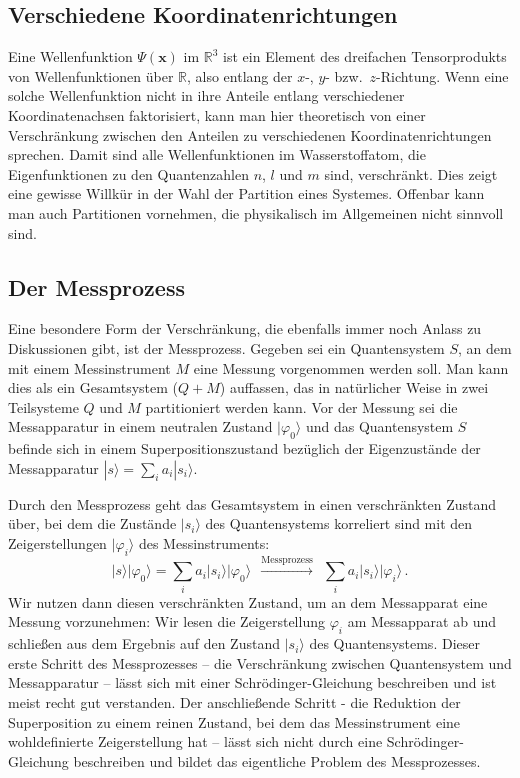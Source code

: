 \subsection{Verschiedene Koordinatenrichtungen}

Eine Wellenfunktion $\Psi(\pmb{x})$ im $\mathbb{R}^3$ ist ein Element des dreifachen Tensorprodukts
von Wellenfunktionen \"uber $\mathbb{R}$, also entlang der $x$-, $y$- bzw.\ $z$-Richtung. 
Wenn eine solche Wellenfunktion nicht in ihre Anteile entlang verschiedener Koordinatenachsen
faktorisiert, kann man hier theoretisch von einer Verschr\"ankung zwischen den Anteilen zu verschiedenen 
Koordinatenrichtungen sprechen. 
Damit sind alle Wellenfunktionen im Wasserstoffatom, die Eigenfunktionen zu
den Quantenzahlen $n$, $l$ und $m$ sind, verschr\"ankt. Dies zeigt eine gewisse Willk\"ur
in der Wahl der Partition eines Systemes. Offenbar kann man auch Partitionen vornehmen,
die physikalisch im Allgemeinen nicht sinnvoll sind. 

\subsection{Der Messprozess}

Eine besondere Form der Verschr\"ankung, 
die ebenfalls immer noch Anlass zu Diskussionen
gibt, ist der Messprozess. Gegeben sei ein Quantensystem $S$, an dem mit einem Messinstrument $M$
eine Messung vorgenommen werden soll. Man kann dies als ein Gesamtsystem ($Q+M$) auffassen,
das in nat\"urlicher Weise in zwei Teilsysteme $Q$ und $M$ partitioniert werden kann. Vor der
Messung sei die Messapparatur in einem neutralen Zustand $|\varphi_0\rangle$ und das
Quantensystem $S$ befinde sich in einem Superpositionszustand bez\"uglich der Eigenzust\"ande
der Messapparatur $| s \rangle = \sum_i a_i | s_i \rangle$. 

Durch den Messprozess geht das Gesamtsystem in einen verschr\"ankten Zustand \"uber, bei
dem die Zust\"ande $|s_i\rangle$ des Quantensystems korreliert sind mit den Zeigerstellungen
$|\varphi_i\rangle$ des Messinstruments:
\begin{equation}
                    | s \rangle | \varphi_0\rangle = \sum_i a_i |s_i\rangle |\varphi_0\rangle 
                       ~~ \overset{\textrm{Messprozess}}{\longrightarrow} ~~
                        \sum_i a_i |s_i\rangle |\varphi_i\rangle \, . 
\end{equation}
Wir nutzen dann diesen verschr\"ankten Zustand, um an dem Messapparat eine Messung vorzunehmen:
Wir lesen die Zeigerstellung $\varphi_i$ am Messapparat ab und schlie\ss en aus dem Ergebnis auf den
Zustand $|s_i\rangle$ des Quantensystems. Dieser erste Schritt des Messprozesses -- die 
Verschr\"ankung zwischen Quantensystem und Messapparatur -- l\"asst sich mit einer
Schr\"odinger-Gleichung beschreiben und ist meist recht gut verstanden. Der anschlie\ss ende
Schritt - die Reduktion der Superposition zu einem reinen Zustand, bei dem das Messinstrument
eine wohldefinierte Zeigerstellung hat -- l\"asst sich nicht durch eine Schr\"odinger-Gleichung
beschreiben und bildet das eigentliche Problem des Messprozesses. 

